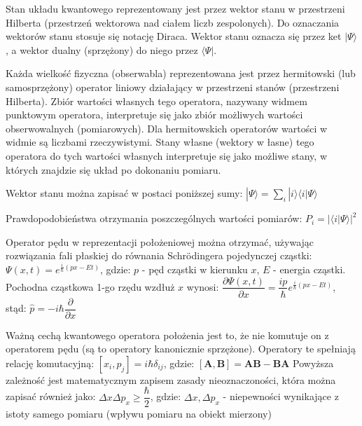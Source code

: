 Stan układu kwantowego reprezentowany jest przez wektor stanu w przestrzeni Hilberta (przestrzeń wektorowa nad ciałem liczb zespolonych). Do oznaczania wektorów stanu stosuje się notację Diraca. Wektor stanu oznacza się przez ket $ |\Psi \rangle $, a wektor dualny (sprzężony) do niego przez $ \langle \Psi | $.

Każda wielkość fizyczna (obserwabla) reprezentowana jest przez hermitowski (lub samosprzężony) operator liniowy działający w przestrzeni stanów (przestrzeni Hilberta). Zbiór wartości własnych tego operatora, nazywany widmem punktowym operatora, interpretuje się jako zbiór możliwych wartości obserwowalnych (pomiarowych). Dla hermitowskich operatorów wartości w widmie są liczbami rzeczywistymi. Stany własne (wektory w łasne) tego operatora do tych wartości własnych interpretuje się jako możliwe stany, w których znajdzie się układ po dokonaniu pomiaru. 

Wektor stanu można zapisać w postaci poniższej sumy:\newline
$ |\Psi\rangle = \sum_i |i \rangle \langle i | \Psi \rangle $

Prawdopodobieństwa otrzymania poszczególnych wartości pomiarów:\newline
$ P_i = |\langle i | \Psi \rangle |^2 $


Operator pędu w reprezentacji położeniowej można otrzymać, używając rozwiązania fali płaskiej do równania Schrödingera pojedynczej cząstki: \newline
$ \Psi(x,t) = e^{\frac{i}{\hbar}(px-Et)} $, gdzie: \newline
$ p $ - pęd cząstki w kierunku $ x $,\newline
$ E $ - energia cząstki.\newline
Pochodna cząstkowa 1-go rzędu wzdłuż $ x $ wynosi:\newline
$ \dfrac{\partial \Psi(x,t)}{\partial x} = \dfrac{ip}{\hbar} e^{\frac{i}{\hbar}(px-Et)} $, stąd:\newline
$ \hat{p} = -i\hbar \dfrac{\partial}{\partial x} $

Ważną cechą kwantowego operatora położenia jest to, że nie komutuje on z operatorem pędu (są to operatory kanonicznie sprzężone). Operatory te spełniają relację komutacyjną:\newline
$ [x_i, p_j] = i\hbar \delta_{ij} $, gdzie:\newline
$ [\textbf{A}, \textbf{B}] = \textbf{A} \textbf{B} - \textbf{B} \textbf{A} $\newline
Powyższa zależność jest matematycznym zapisem zasady nieoznaczoności, która można zapisać również jako:\newline
$ \Delta x \Delta p_x \geq \dfrac{\hbar}{2} $, gdzie:\newline
$ \Delta x, \Delta p_x $ - niepewności wynikające z istoty samego pomiaru (wpływu pomiaru na obiekt mierzony)
